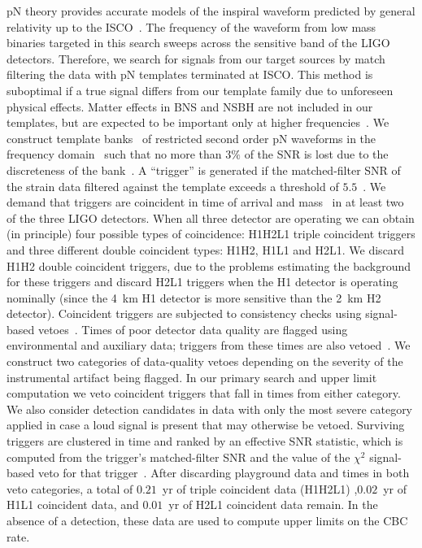 \ac{pN} theory provides accurate models of the inspiral waveform predicted by 
general relativity up to the
\ac{ISCO}~\cite{Blanchet:1996pi,Droz:1999qx,Blanchet:2002av,%
Buonanno:2006ui,Boyle:2007ft,Hannam:2007ik,%
pan:024014,Boyle:2009dg}. The frequency of the waveform from low mass binaries 
targeted in this search sweeps across the sensitive band of the LIGO detectors.
Therefore, we search for signals from our target sources by match filtering 
the data with \ac{pN} templates terminated at \ac{ISCO}. This method is 
suboptimal if a true signal differs from our template family due to unforeseen
physical effects. Matter effects in BNS and NSBH are not included in our 
templates, but are expected to be important only at higher frequencies~\cite{Shibata:2009cn,Kiuchi:2009jt}. We construct template banks~\cite{hexabank} of 
restricted second order \ac{pN} waveforms in the frequency
domain~\cite{thorne.k:1987,SathyaDhurandhar:1991,Droz:1999qx} such that no
more than $3\%$ of the \ac{SNR} is lost due to the discreteness of the 
bank~\cite{Owen:1998dk}. A ``trigger'' is generated if the matched-filter 
\ac{SNR} of the strain data filtered against the template exceeds a
threshold of $5.5$~\cite{Allen:2005fk}.  We demand that triggers are coincident 
in time of arrival and mass~\cite{Robinson:2008} in at least two of the 
three \ac{LIGO} detectors. When all three detector are operating we can obtain 
(in principle) four possible types of coincidence: H1H2L1 triple coincident 
triggers and three different double coincident types: H1H2, H1L1 and H2L1. 
We discard H1H2 double coincident triggers, due to the problems estimating the 
background for these triggers and discard H2L1 triggers when the H1 detector is
operating nominally (since the 4~km H1 detector is more sensitive than the 2~km 
H2 detector).
%
Coincident triggers are subjected to consistency checks using signal-based
vetoes~\cite{LIGOS3S4Tuning,Allen:2004,Rodriguez:2007}. Times of poor detector
data quality are flagged using environmental and auxiliary data;
triggers from these times are also vetoed~\cite{Collaboration:2009tt}. We
construct two categories of data-quality vetoes depending on the severity of
the instrumental artifact being flagged. In our primary search and upper limit
computation we veto coincident triggers that fall in times from either
category. We also consider detection candidates in data with only the most
severe category applied in case a loud signal is present that may
otherwise be vetoed.   Surviving triggers are clustered in time and ranked by
an effective \ac{SNR} statistic, which is computed from the trigger's
matched-filter \ac{SNR} and the value of the $\chi^2$ signal-based veto for
that trigger~\cite{LIGOS3S4all}.  After discarding playground data and times
in both veto categories, a total of $0.21$~yr of triple coincident data (H1H2L1)
,$0.02$~yr of H1L1 coincident data, and $0.01$~yr of H2L1 coincident data
remain. In the absence of a detection, these data are used to compute upper
limits on the \ac{CBC} rate.

